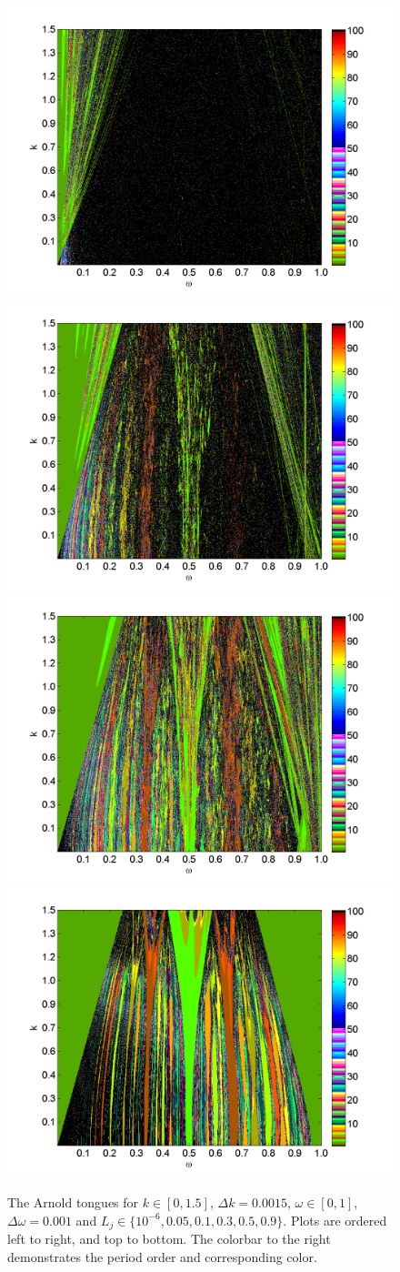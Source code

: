\begin{figure}[H]\linespread{1}  
\caption[The Arnold tongues for the random circle map]{The Arnold
  tongues for $k\in [0,1.5]$, $\Delta k = 0.0015$, $\omega \in [0,1]$,
  $\Delta \omega = 0.001$ and $L_j \in \{10^{-6},0.05,0.1,0.3,0.5,0.9\}$. Plots are ordered left to right, and top to bottom. The colorbar
to the right demonstrates the period order and corresponding color.}\label{fig:randtongues}
\centering
\includegraphics[width=.5\textwidth]{figs/tongues_1000_L_1e-05.png}\hfill
\includegraphics[width=.5\textwidth]{figs/tongues_1000_L_005.png}\\
\includegraphics[width=.5\textwidth]{figs/tongues_1000_L_01.png}\hfill
\includegraphics[width=.5\textwidth]{figs/tongues_1000_L_03.png}\\

\end{figure}
